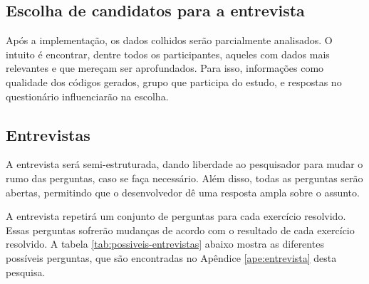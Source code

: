 \subsection{Escolha de candidatos para a entrevista}

Após a implementação, os dados colhidos serão parcialmente analisados. O intuito
é encontrar, dentre todos os participantes, aqueles com dados mais relevantes
e que mereçam ser aprofundados.
Para isso, informações como qualidade dos códigos gerados, grupo que participa
do estudo, e respostas no questionário influenciarão na escolha.

\subsection{Entrevistas}
\label{sec:planejamento-estrategia-entrevistas}

A entrevista será semi-estruturada, dando liberdade ao
pesquisador para mudar o rumo das perguntas, caso se faça necessário.
Além disso, todas as perguntas serão abertas, permitindo que o desenvolvedor dê
uma resposta ampla sobre o assunto.

A entrevista repetirá um conjunto de perguntas para cada exercício resolvido.
Essas perguntas sofrerão mudanças de acordo com o resultado de cada exercício resolvido.
A tabela \ref{tab:possiveis-entrevistas} abaixo mostra as diferentes possíveis perguntas, que são encontradas
no Apêndice \ref{ape:entrevista} desta pesquisa.

